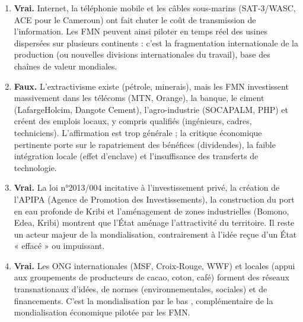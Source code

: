 \documentclass[11pt]{article}
\newcommand{\cle}[1]{{\popxbold\color{popdark}#1}}
\begin{document}
\begin{corrige}
\begin{enumerate}
    \item \textbf{Vrai.} Internet, la téléphonie mobile et les câbles sous-marins (SAT-3/WASC, ACE pour le Cameroun) ont fait chuter le coût de transmission de l'information. Les FMN peuvent ainsi piloter en temps réel des usines dispersées sur plusieurs continents : c'est la \cle{fragmentation internationale de la production} (ou nouvelles divisions internationales du travail), base des chaînes de valeur mondiales.
    \item \textbf{Faux.} L'extractivisme existe (pétrole, minerais), mais les FMN investissent massivement dans les télécoms (MTN, Orange), la banque, le ciment (LafargeHolcim, Dangote Cement), l'agro-industrie (SOCAPALM, PHP) et créent des emplois locaux, y compris qualifiés (ingénieurs, cadres, techniciens). L'affirmation est trop générale ; la critique économique pertinente porte sur le \cle{rapatriement des bénéfices} (dividendes), la faible intégration locale (effet d'enclave) et l'insuffisance des transferts de technologie.
    \item \textbf{Vrai.} La loi n°2013/004 incitative à l'investissement privé, la création de l'APIPA (Agence de Promotion des Investissements), la construction du port en eau profonde de Kribi et l'aménagement de zones industrielles (Bomono, Edea, Kribi) montrent que l'\cle{État aménage l'attractivité} du territoire. Il reste un acteur majeur de la mondialisation, contrairement à l'idée reçue d'un État « effacé » ou impuissant.
    \item \textbf{Vrai.} Les ONG internationales (MSF, Croix-Rouge, WWF) et locales (appui aux groupements de producteurs de cacao, coton, café) forment des \cle{réseaux transnationaux} d'idées, de normes (environnementales, sociales) et de financements. C'est la \og mondialisation par le bas \fg{}, complémentaire de la mondialisation économique pilotée par les FMN.
\end{enumerate}
\end{corrige}
\end{document}
